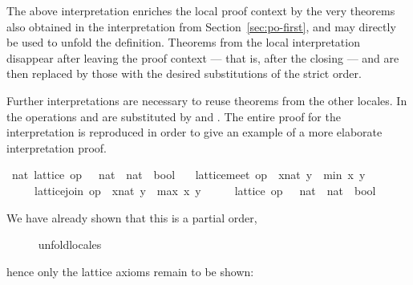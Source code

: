 \begin{isabellebody}
\begin{isamarkuptext}
  The above interpretation enriches the local proof context by
  the very theorems also obtained in the interpretation from
  Section~\ref{sec:po-first}, and  may directly be
  used to unfold the definition.  Theorems from the local
  interpretation disappear after leaving the proof context --- that
  is, after the closing  --- and are
  then replaced by those with the desired substitutions of the strict
  order.%
\end{isamarkuptext}%
\isamarkuptrue%
%
\isamarkuptrue%
%
\begin{isamarkuptext}%
Further interpretations are necessary to reuse theorems from
  the other locales.  In  the operations \isa{{\isasymsqinter}} and
  \isa{{\isasymsqunion}} are substituted by  and
  .  The entire proof for the
  interpretation is reproduced in order to give an example of a more
  elaborate interpretation proof.%
\end{isamarkuptext}%
\isamarkuptrue%
%
\isadelimvisible
%
\endisadelimvisible
%
\isatagvisible
{}\isamarkupfalse%
\ nat{\isacharcolon}\ lattice\ {\isachardoublequoteopen}op\ {\isasymle}\ {\isacharcolon}{\isacharcolon}\ nat\ {\isasymRightarrow}\ nat\ {\isasymRightarrow}\ bool{\isachardoublequoteclose}\isanewline
\ \ \ {\isachardoublequoteopen}lattice{\isachardot}meet\ op\ {\isasymle}\ {\isacharparenleft}x{\isacharcolon}{\isacharcolon}nat{\isacharparenright}\ y\ {\isacharequal}\ min\ x\ y{\isachardoublequoteclose}\isanewline
\ \ \ \ \ {\isachardoublequoteopen}lattice{\isachardot}join\ op\ {\isasymle}\ {\isacharparenleft}x{\isacharcolon}{\isacharcolon}nat{\isacharparenright}\ y\ {\isacharequal}\ max\ x\ y{\isachardoublequoteclose}\isanewline
{}\isamarkupfalse%
\ {\isacharminus}\isanewline
\ \ \isamarkupfalse%
\ {\isachardoublequoteopen}lattice\ {\isacharparenleft}op\ {\isasymle}\ {\isacharcolon}{\isacharcolon}\ nat\ {\isasymRightarrow}\ nat\ {\isasymRightarrow}\ bool{\isacharparenright}{\isachardoublequoteclose}%
\begin{isamarkuptxt}%
We have already shown that this is a partial order,%
\end{isamarkuptxt}%
\isamarkuptrue%
\ \ \ \ \isamarkupfalse%
\ unfold{\isacharunderscore}locales%
\begin{isamarkuptxt}%
hence only the lattice axioms remain to be shown: \begin{isabelle}%

\end{isabelle}
\end{isamarkuptxt}
\end{isabellebody}
